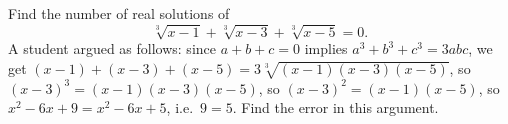 Find the number of real solutions of
\[
\sqrt[3]{x-1}+\sqrt[3]{x-3}+\sqrt[3]{x-5}=0 .
\]
A student argued as follows: since $a+b+c=0$ implies $a^3+b^3+c^3=3abc$, we get $(x-1)+(x-3)+(x-5)=3\sqrt[3]{(x-1)(x-3)(x-5)}$, so $(x-3)^3=(x-1)(x-3)(x-5)$, so $(x-3)^2=(x-1)(x-5)$, so $x^2-6x+9=x^2-6x+5$, i.e.\ $9=5$. Find the error in this argument.
